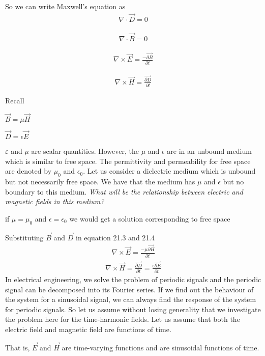 So we can write Maxwell's equation as
\begin{align}
\nabla\cdot\vec{D}=0
\end{align}

\begin{align}
\nabla\cdot\vec{B}=0
\end{align}

\begin{align}
\nabla\times\vec{E}=\frac{-\vec{\partial B}}{\partial t}
\end{align}

\begin{align}
\nabla\times\vec{H}=\frac{\vec{\partial D}}{\partial t}
\end{align}

Recall 

$\vec{B}=\mu\vec{H}$

$\vec{D}=\epsilon\vec{E}$

$\varepsilon$ and $\mu$ are scalar quantities. However, the $\mu$ and $\epsilon$ are in an unbound medium which is similar to free space. The permittivity and permeability for free space are denoted by $\mu_{0}$ and $\epsilon_{0}$. Let us consider a dielectric medium which is unbound but not necessarily free space. We have that the medium has $\mu$ and $\epsilon$ but no boundary to this medium. \emph{What will be the relationship between electric and magnetic fields in this medium?} 


if $\mu=\mu_{0}$ and $\epsilon=\epsilon_{0}$ we would get a solution corresponding to free space

Substituting $\vec{B}$ and 	$\vec{D}$ in equation 21.3 and 21.4
\begin{align}
\nabla\times\vec{E}=\frac{-\mu\vec{\partial H}}{\partial t}
\end{align}
\begin{align}
\nabla\times\vec{H}=\frac{\vec{\partial D}}{\partial t}=\frac{\epsilon\vec{\partial E}}{\partial t}
\end{align}
In electrical engineering, we solve the problem of periodic signals and the periodic signal can be decomposed into its Fourier series. If we find out the behaviour of the system for a sinusoidal signal, we can always find the response of the system for periodic signals. So let us assume without losing generality that we investigate the problem here for the time-harmonic fields. Let us assume that both the electric field and magnetic field are functions of time.

That is, $\vec{E}$ and $\vec{H}$ are time-varying functions and are sinusoidal functions of time.

